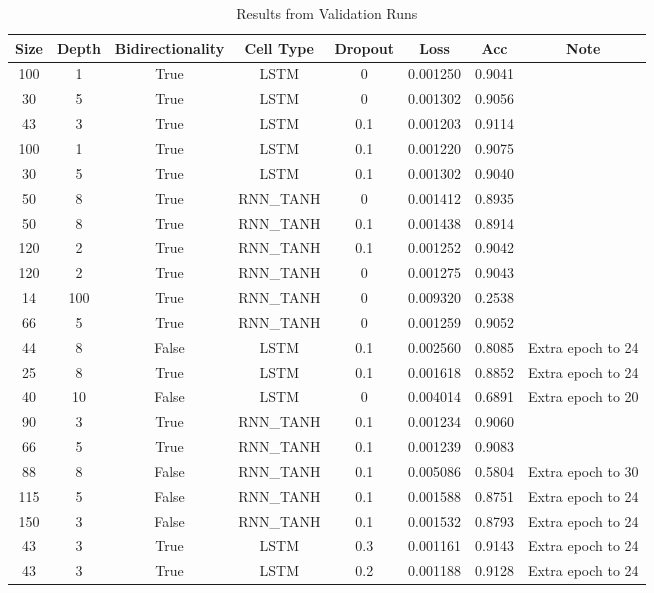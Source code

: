 \documentclass[11pt]{article} %
\begin{document}
\begin{table}[h]
    \begin{center}
        \caption{Results from Validation Runs}
        \label{tab:table1}
        \begin{tabular}{c|c|c|c|c|c|c|c}
            \textbf{Size} & \textbf{Depth} & \textbf{Bidirectionality} & \textbf{Cell Type} & \textbf{Dropout} & \textbf{Loss} & \textbf{Acc} & \textbf{Note}\\
            \hline
            100 & 1 & True & LSTM & 0 & 0.001250 & 0.9041 & \\
            30 & 5 & True & LSTM & 0 & 0.001302 & 0.9056 & \\
            43 & 3 & True & LSTM & 0.1 & 0.001203 & 0.9114 & \\
            100 & 1 & True & LSTM & 0.1 & 0.001220 & 0.9075 & \\
            30 & 5 & True & LSTM & 0.1 & 0.001302 & 0.9040 & \\
            50 & 8 & True & RNN\_TANH & 0 & 0.001412 & 0.8935 & \\
            50 & 8 & True & RNN\_TANH & 0.1 & 0.001438 & 0.8914 & \\
            120 & 2 & True & RNN\_TANH & 0.1 & 0.001252 & 0.9042 & \\
            120 & 2 & True & RNN\_TANH & 0 & 0.001275 & 0.9043 & \\
            14 & 100 & True & RNN\_TANH & 0 & 0.009320 & 0.2538 & \\
            66 & 5 & True & RNN\_TANH & 0 & 0.001259 & 0.9052 & \\
            44 & 8 & False & LSTM & 0.1 & 0.002560 & 0.8085 & Extra epoch to 24\\
            25 & 8 & True & LSTM & 0.1 & 0.001618 & 0.8852 & Extra epoch to 24\\
            40 & 10 & False & LSTM & 0 & 0.004014 & 0.6891 & Extra epoch to 20\\
            90 & 3 & True & RNN\_TANH & 0.1 & 0.001234 & 0.9060 & \\
            66 & 5 & True & RNN\_TANH & 0.1 & 0.001239 & 0.9083 & \\
            88 & 8 & False & RNN\_TANH & 0.1 & 0.005086 & 0.5804 & Extra epoch to 30\\
            115 & 5 & False & RNN\_TANH & 0.1 & 0.001588 & 0.8751 & Extra epoch to 24\\
            150 & 3 & False & RNN\_TANH & 0.1 & 0.001532 & 0.8793 & Extra epoch to 24\\
            43 & 3 & True & LSTM & 0.3 & 0.001161 & 0.9143 & Extra epoch to 24\\
            43 & 3 & True & LSTM & 0.2 & 0.001188 & 0.9128 & Extra epoch to 24\\
        \end{tabular}
    \end{center}
\end{table}
\end{document}
